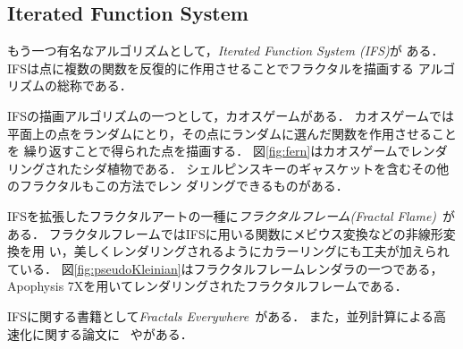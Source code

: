 \subsection{Iterated Function System}

もう一つ有名なアルゴリズムとして，\textit{Iterated Function System (IFS)}が
ある．IFSは点に複数の関数を反復的に作用させることでフラクタルを描画する
アルゴリズムの総称である．

IFSの描画アルゴリズムの一つとして，カオスゲームがある．
カオスゲームでは平面上の点をランダムにとり，その点にランダムに選んだ関数を作用させることを
繰り返すことで得られた点を描画する．
図\ref{fig:fern}はカオスゲームでレンダリングされたシダ植物である．
シェルピンスキーのギャスケットを含むその他のフラクタルもこの方法でレン
ダリングできるものがある．

IFSを拡張したフラクタルアートの一種に\emph{フラクタルフレーム}\textit{(Fractal
Flame)}~\cite{draves2003fractal}がある．
フラクタルフレームではIFSに用いる関数にメビウス変換などの非線形変換を用
い，美しくレンダリングされるようにカラーリングにも工夫が加えられている．
図\ref{fig:pseudoKleinian}はフラクタルフレームレンダラの一つである，
Apophysis 7Xを用いてレンダリングされたフラクタルフレームである．

IFSに関する書籍として\textit{Fractals
Everywhere}~\cite{BarnsleyMathematics201207}がある．
また，並列計算による高速化に関する論文に
~\cite{2010_fractal_flames}や\cite{Green:2005:GIF:1187112.1187128}がある．

